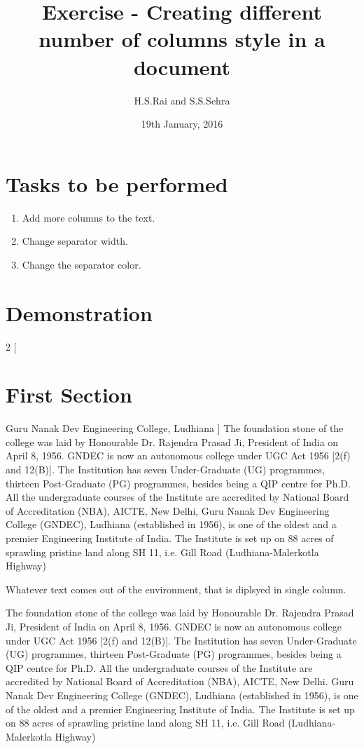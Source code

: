 \documentclass{article}
\title{Exercise  - Creating different number of columns style in a document}
\author{H.S.Rai and S.S.Sehra}
\date{19th January, 2016}
\begin{document}
	\maketitle	
	\section*{Tasks to be performed}
	\begin{enumerate}	
		\item Add more columns to the text.
		\item Change separator width.
		\item Change the separator color.
		\end{enumerate}
	\section*{Demonstration}
	\begin{multicols}{2}
		[
		\section{First Section}
		Guru Nanak Dev Engineering College, Ludhiana
		]
				 The foundation stone of the college
				 was laid by Honourable Dr. Rajendra Prasad Ji, President of India on April 8,
				 1956. GNDEC is now an autonomous college under UGC Act 1956 [2(f) and
				 12(B)]. The Institution has seven Under-Graduate (UG) programmes,
				 thirteen Post-Graduate (PG) programmes, besides being a QIP centre for
				 Ph.D. All the undergraduate courses of the Institute are accredited by
				 National Board of Accreditation (NBA), AICTE, New Delhi, Guru Nanak Dev Engineering College (GNDEC), Ludhiana (established in
				 1956), is one of the oldest and a premier Engineering Institute of India. The
				 Institute is set up on 88 acres of sprawling pristine land along SH 11, i.e. Gill
				 Road (Ludhiana-Malerkotla Highway)
	\end{multicols}
	Whatever text comes out of the environment, that is diplsyed in single column.
	

The foundation stone of the college
was laid by Honourable Dr. Rajendra Prasad Ji, President of India on April 8,
1956. GNDEC is now an autonomous college under UGC Act 1956 [2(f) and
12(B)]. The Institution has seven Under-Graduate (UG) programmes,
thirteen Post-Graduate (PG) programmes, besides being a QIP centre for
Ph.D. All the undergraduate courses of the Institute are accredited by
National Board of Accreditation (NBA), AICTE, New Delhi. 	Guru Nanak Dev Engineering College (GNDEC), Ludhiana (established in
1956), is one of the oldest and a premier Engineering Institute of India. The
Institute is set up on 88 acres of sprawling pristine land along SH 11, i.e. Gill
Road (Ludhiana-Malerkotla Highway)
\end{document}
